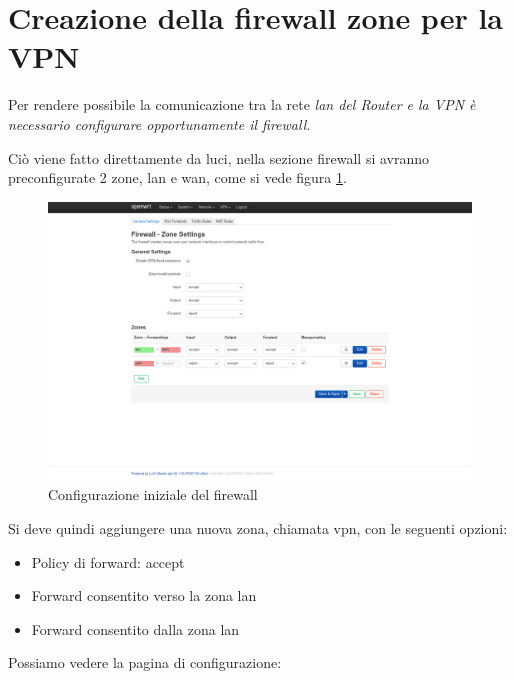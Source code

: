 \section{Creazione della firewall zone per la VPN} 

Per rendere possibile la comunicazione tra la rete \it{lan} del \it{Router} e la VPN è necessario configurare opportunamente il firewall.

Ciò viene fatto direttamente da luci, nella sezione firewall si avranno preconfigurate 2 zone, lan e wan, come si vede figura \ref{fig:luci-firewall-init}.

\begin{figure}[H]
    \centering
    \includegraphics[width=0.9\linewidth]{immagini/LuCI_firewall_init}
    \caption{Configurazione iniziale del firewall}
    \label{fig:luci-firewall-init}
\end{figure}

Si deve quindi aggiungere una nuova zona, chiamata vpn, con le seguenti opzioni:
\begin{itemize}
    \item Policy di forward: accept
    \item Forward consentito verso la zona lan
    \item Forward consentito dalla zona lan
\end{itemize}

Possiamo vedere la pagina di configurazione:


